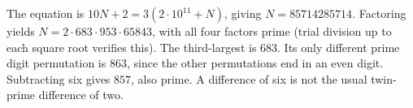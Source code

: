 The equation is $10N+2=3(2\cdot10^{11}+N)$, giving $N=85714285714$. Factoring yields $N=2\cdot683\cdot953\cdot65843$, with all four factors prime (trial division up to each square root verifies this). The third-largest is $683$. Its only different prime digit permutation is $863$, since the other permutations end in an even digit. Subtracting six gives $\boxed{857}$, also prime. A difference of six is not the usual twin-prime difference of two.

